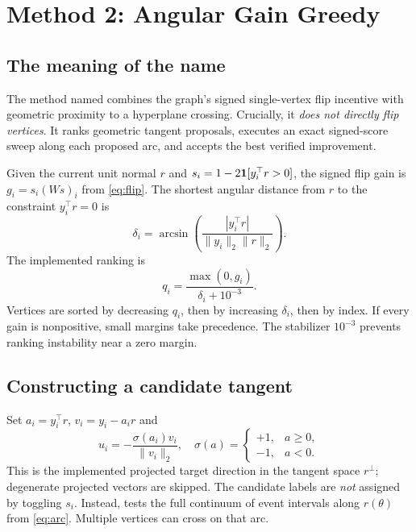 \section{Method 2: Angular Gain Greedy}\label{sec:gain}
\subsection{The meaning of the name}
The method named  combines the graph's signed single-vertex flip incentive with geometric proximity to a hyperplane crossing. Crucially, it \emph{does not directly flip vertices}. It ranks geometric tangent proposals, executes an exact signed-score sweep along each proposed arc, and accepts the best verified improvement.

Given the current unit normal $r$ and $s_i=1-2\mathbf{1}[y_i^\top r>0]$, the signed flip gain is $g_i=s_i(Ws)_i$ from \eqref{eq:flip}. The shortest angular distance from $r$ to the constraint $y_i^\top r=0$ is
\begin{equation}\label{eq:margin}
\delta_i=\arcsin\!\left(\frac{|y_i^\top r|}{\|y_i\|_2\|r\|_2}\right).
\end{equation}
The implemented ranking is
\begin{equation}\label{eq:priority}
q_i=\frac{\max(0,g_i)}{\delta_i+10^{-3}}.
\end{equation}
Vertices are sorted by decreasing $q_i$, then by increasing $\delta_i$, then by index. If every gain is nonpositive, small margins take precedence. The stabilizer $10^{-3}$ prevents ranking instability near a zero margin.

\subsection{Constructing a candidate tangent}
Set $a_i=y_i^\top r$, $v_i=y_i-a_ir$ and
\begin{equation}\label{eq:targettangent}
u_i=-\frac{\sigma(a_i)v_i}{\|v_i\|_2},\quad
\sigma(a)=\begin{cases}+1,&a\ge0,\\-1,&a<0.\end{cases}
\end{equation}
This is the implemented projected target direction in the tangent space $r^\perp$; degenerate projected vectors are skipped. The candidate labels are \emph{not} assigned by toggling $s_i$. Instead,  tests the full continuum of event intervals along $r(\theta)$ from \eqref{eq:arc}. Multiple vertices can cross on that arc.


